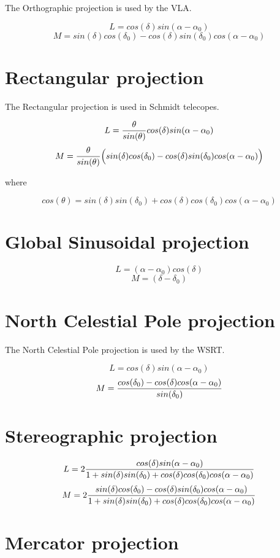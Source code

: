 The Orthographic projection is used by the VLA.

$$L = cos(\delta) sin(\alpha-\alpha_0)$$
$$M = sin(\delta) cos(\delta_0) - cos(\delta) sin(\delta_0) cos(\alpha-\alpha_0)$$

\section{Rectangular projection}

The Rectangular projection is used in Schmidt telecopes.

$$L = {{\theta}\over{sin(\theta)}} cos(\delta) sin(\alpha-\alpha_0)$$
$$M = {{\theta}\over{sin(\theta)}} \Bigl(sin(\delta) cos(\delta_0) - cos(\delta) sin(\delta_0) cos(\alpha-\alpha_0)\Bigr)$$

where

$$cos(\theta) = sin(\delta) sin(\delta_0) + cos(\delta) cos(\delta_0) cos(\alpha-\alpha_0)$$

\section{Global Sinusoidal projection}

$$L = (\alpha-\alpha_0) cos(\delta)$$
$$M = (\delta-\delta_0)$$

\section{North Celestial Pole projection}

The North Celestial Pole projection is used by the WSRT.

$$L = cos(\delta) sin(\alpha-\alpha_0)$$
$$M = {{cos(\delta_0) - cos(\delta) cos(\alpha-\alpha_0)}\over{sin(\delta_0)}}$$

\section{Stereographic projection}

$$L = 2 {{cos(\delta) sin(\alpha-\alpha_0)}\over{1 + sin(\delta) sin(\delta_0) + cos(\delta) cos(\delta_0) cos(\alpha-\alpha_0)}}$$
$$M = 2 {{sin(\delta) cos(\delta_0) - cos(\delta) sin(\delta_0) cos(\alpha-\alpha_0)}\over{1 + sin(\delta) sin(\delta_0) + cos(\delta) cos(\delta_0) cos(\alpha-\alpha_0)}}$$

\section{Mercator projection}

